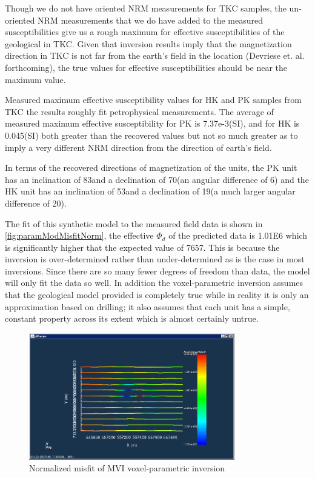 Though we do not have oriented \ac{NRM} measurements for TKC samples, the un-oriented \ac{NRM} measurements that we do have added to the measured susceptibilities give us a rough maximum for effective susceptibilities of the  geological in TKC. Given that inversion results imply that the magnetization direction in TKC is not far from the earth's field in the location (Devriese et. al. forthcoming), the true  values for effective susceptibilities should be near the maximum value.

Measured maximum effective susceptibility values for HK and PK samples from TKC the results roughly fit petrophysical measurements. The average of measured maximum effective susceptibility for PK is 7.37e-3(SI), and for HK is 0.045(SI) both greater than the recovered values but not so much greater as to imply a very different \ac{NRM} direction from the direction of earth's field.

In terms of the recovered directions of magnetization of the units, the PK unit has an inclination of 83\degree and a declination of 70\degree (an angular difference of 6\degree) and the HK unit has an inclination of 53\degree and a declination of 19\degree (a much larger angular difference of 20\degree).


The fit of this synthetic model to the measured field data is shown in  \autoref{fig:paramModMisfitNorm}, the effective $\Phi_d$ of the predicted data is 
1.01E6 which is significantly higher that the expected value of 7657. This is because the inversion is over-determined rather than under-determined as is the case in most inversions. Since there are so many fewer degrees of freedom than data, the model will only fit the data so well. In addition the voxel-parametric inversion assumes that the geological model provided is completely true while in reality it is only an approximation based on drilling; it also assumes that each unit has a simple, constant property across its extent which is almost certainly untrue.

\begin{figure} [h]
   \centering
   \includegraphics[width=0.8\textwidth]{images/TKC/paramModMisfitNorm.PNG}
   \caption{Normalized misfit of \ac{MVI} voxel-parametric  inversion}
   \label{fig:paramModMisfitNorm}
\end{figure}

